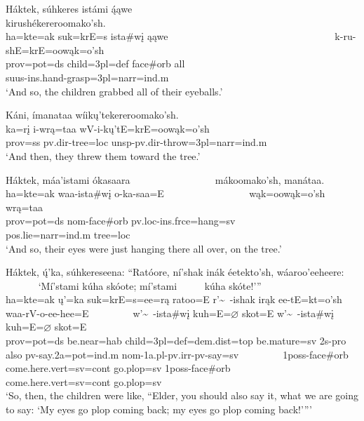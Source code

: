 \begin{exe}
\item\label{EJ29} \glll Háktek, súhkeres istámi ą́ąwe ~ ~ ~ ~ ~ ~ ~ ~ ~ ~ ~ ~ ~ ~ ~ ~ ~ ~ ~ ~ kirushékereroomako'sh.\\
ha=kte=ak suk=krE=s ista\#wį ąąwe ~ ~ ~ ~ ~ ~ ~ ~ ~ ~ ~ ~ ~ ~ ~ ~ ~ ~ ~ ~ k-ru-shE=krE=oowąk=o'sh\\
prov=pot=ds \textnormal{child}=3pl=def  \textnormal{face}\#\textnormal{orb} \textnormal{all} ~ ~ ~ ~ ~ ~ ~ ~ ~ ~ ~ ~ ~ ~ ~ ~ ~ ~ ~ ~ suus-ins.hand-\textnormal{grasp}=3pl=narr=ind.m\\
\glt `And so, the children grabbed all of their eyeballs.'

\item\label{EJ30} \glll Káni, ímanataa wíikų'tekereroomako'sh.\\
ka=rį i-wrą=taa wV-i-kų'tE=krE=oowąk=o'sh\\
prov=ss pv.dir-\textnormal{tree}=loc unsp-pv.dir-\textnormal{throw}=3pl=narr=ind.m\\
\glt `And then, they threw them toward the tree.'

\item\label{EJ31} \glll Háktek, máa'istami ókasaara ~ ~ ~ ~ ~ ~ ~ ~ ~ ~ mákoomako'sh, manátaa.\\
ha=kte=ak waa-ista\#wį o-ka-saa=E ~ ~ ~ ~ ~ ~ ~ ~ ~ ~ wąk=oowąk=o'sh wrą=taa\\
prov=pot=ds nom-\textnormal{face}\#\textnormal{orb} pv.loc-ins.frce=\textnormal{hang}=sv ~ ~ ~ ~ ~ ~ ~ ~ ~ ~ pos.lie=narr=ind.m \textnormal{tree}=loc\\
\glt `And so, their eyes were just hanging there all over, on the tree.'

\item\label{EJ32} \glll Háktek, ų́'ka, súhkereseena: ``Ratóore, ní'shak inák éetekto'sh, wáaroo'eeheere: ~ ~ ~ ~ ~ `Mí'stami kúha skóote; mí'stami ~ ~ ~ kúha skóte!'{''}\\
ha=kte=ak ų'=ka suk=krE=s=ee=rą ratoo=E r'\~~-ishak irąk ee-tE=kt=o'sh waa-rV-o-ee-hee=E ~ ~ ~ ~ ~ w'\~~-ista\#wį kuh=E=$\varnothing$ skot=E w'\~~-ista\#wį ~ ~ ~ kuh=E=$\varnothing$ skot=E\\
prov=pot=ds \textnormal{be.near}=hab \textnormal{child}=3pl=def=dem.dist=top \textnormal{be.mature}=sv 2s-pro \textnormal{also} pv-\textnormal{say}.2a=pot=ind.m nom-1a.pl-pv.irr-pv-\textnormal{say}=sv ~ ~ ~ ~ ~ 1poss-\textnormal{face}\#\textnormal{orb} \textnormal{come.here}.vert=sv=cont \textnormal{go.plop}=sv 1poss-\textnormal{face}\#\textnormal{orb} ~ ~ ~ \textnormal{come.here}.vert=sv=cont \textnormal{go.plop}=sv\\
\glt `So, then, the children were like, ``Elder, you should also say it, what we are going to say: `My eyes go plop coming back; my eyes go plop coming back!'{''}'


\end{exe}
